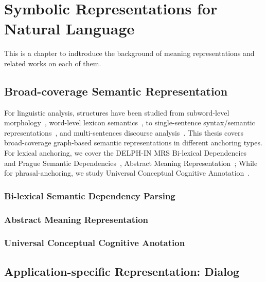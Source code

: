 \section{Symbolic Representations for Natural Language}
\label{sec:bg:symbolic}

This is a chapter to indtroduce the background of meaning representations and related works on each of them.

\subsection{Broad-coverage Semantic Representation}
\label{ssec:bg:broad-mr}

For linguistic analysis, structures have been studied from
subword-level morphology~\cite{beesley2003finite}, word-level lexicon
semantics~\cite{miller1998wordnet}, to single-sentence syntax/semantic
representations~\cite{baker1998berkeley,palmer2005proposition,collins2003head},
and multi-sentences discourse
analysis~\cite{carlson2003building,wolf2005representing,prasad2008penn}. This
thesis covers broad-coverage graph-based semantic representations in
different anchoring types. For lexical anchoring, we cover the
DELPH-IN MRS Bi-lexical Dependencies~\cite[DM,][]{ivanova2012did} and
Prague Semantic
Dependencies~\cite[PSD,][]{hajic2012announcing,miyao2014house},
Abstract Meaning Representation~\cite[AMR,][]{Ban:Bon:Cai:13}; While
for phrasal-anchoring, we study Universal Conceptual Cognitive
Annotation~\cite[UCCA,][]{Abe:Rap:13b}.

\subsubsection{Bi-lexical Semantic Dependency Parsing}

\subsubsection{Abstract Meaning Representation}

\subsubsection{Universal Conceptual Cognitive Anotation}

\subsection{Application-specific Representation: Dialog}

